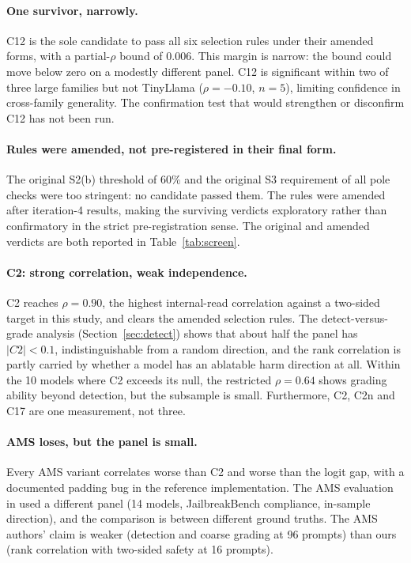 \documentclass[11pt,letterpaper]{article}
\begin{document}
\paragraph{One survivor, narrowly.}
C12 is the sole candidate to pass all six selection rules under their
amended forms, with a partial-$\rho$ bound of 0.006. This margin is
narrow: the bound could move below zero on a modestly different panel.
C12 is significant within two of three large families but not TinyLlama
($\rho = -0.10$, $n = 5$), limiting confidence in cross-family
generality. The confirmation test that would strengthen or disconfirm C12
has not been run.

\paragraph{Rules were amended, not pre-registered in their final form.}
The original S2(b) threshold of 60\% and the original S3 requirement of
all pole checks were too stringent: no candidate passed them. The rules
were amended after iteration-4 results, making the surviving verdicts
exploratory rather than confirmatory in the strict pre-registration sense.
The original and amended verdicts are both reported in
Table~\ref{tab:screen}.

\paragraph{C2: strong correlation, weak independence.}
C2 reaches $\rho = 0.90$, the highest internal-read correlation against a
two-sided target in this study, and clears the amended selection rules.
The detect-versus-grade analysis (Section~\ref{sec:detect}) shows that
about half the panel has $|C2| < 0.1$, indistinguishable from a random
direction, and the rank correlation is partly carried by whether a model
has an ablatable harm direction at all. Within the 10 models where C2
exceeds its null, the restricted $\rho = 0.64$ shows grading ability
beyond detection, but the subsample is small. Furthermore, C2, C2n and
C17 are one measurement, not three.

\paragraph{AMS loses, but the panel is small.}
Every AMS variant correlates worse than C2 and worse than the logit gap,
with a documented padding bug in the reference implementation. The AMS
evaluation in \citet{Messenger2026} used a different panel (14 models,
JailbreakBench compliance, in-sample direction), and the comparison is
between different ground truths. The AMS authors' claim is weaker
(detection and coarse grading at 96 prompts) than ours (rank correlation
with two-sided safety at 16 prompts).
\end{document}
